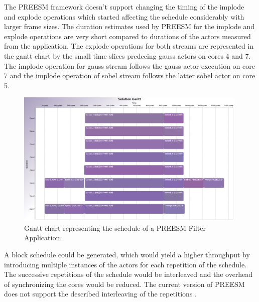 The PREESM framework doesn't support changing the timing of the implode and explode operations which started affecting the schedule considerably with larger frame sizes. The duration estimates used by PREESM for the implode and explode operations are very short compared to durations of the actors measured from the application. The explode operations for both streams are represented in the gantt chart by the small time slices predecing gauss actors on cores 4 and 7. The implode operation for gauss stream follows the gauss actor execution on core 7 and the implode operation of sobel stream follows the latter sobel actor on core 5.

\begin{figure}[h!]
    \begin{center}
        \includegraphics[width=0.99\textwidth]{images/gantt_preesm_cifcif.png}
        \caption{Gantt chart representing the schedule of a PREESM Filter Application.}
        \label{fig:preesm_gantt}
    \end{center}
\end{figure}

A block schedule could be generated, which would yield a higher throughput by introducing multiple instances of the actors for each repetition of the schedule. The successive repetitions of the schedule would be interleaved and the overhead of synchronizing the cores would be reduced. The current version of PREESM does not support the described interleaving of the repetitions \cite{pelcat2014preesm}.
